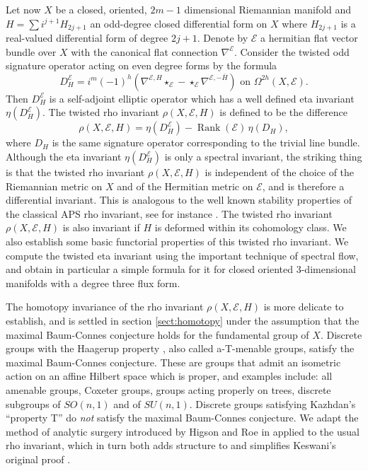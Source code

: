 \documentclass[12pt]{amsart}
\theoremstyle{plain}
\theoremstyle{definition}
\theoremstyle{remark}
\begin{document}
Let now $X$ be a closed, oriented, {{$2m - 1$}} dimensional Riemannian manifold and 
$H = \sum i^{j+1} H_{2j+1} $ an 
odd-degree closed differential form on $X$ where $H_{2j+1}$ is a real-valued differential form 
of degree ${2j+1}$. Denote by ${\mathcal E}$ a hermitian flat vector bundle over $X$ with the 
canonical flat connection $\nabla^{\mathcal E}$.
Consider the twisted odd signature operator acting on even degree forms by the formula
$$
{{D^{\mathcal E}_H = i^m (-1)^{ h} ( \nabla^{{\mathcal E}, H}\star_{\mathcal E} -  \star_{\mathcal E} \nabla^{{\mathcal E}, -{\overline{H}}})}} \text{ on }
\Omega^{2h}(X, {\mathcal E}).
$$
Then $D^{\mathcal E}_H$ is a self-adjoint
elliptic operator which has a well defined  eta invariant  $\eta(D^{\mathcal E}_H )$. The twisted rho invariant 
$\rho(X, {\mathcal E}, H)$ is defined to be the difference 
$$
\rho(X, {\mathcal E}, H) = \eta(D^{\mathcal E}_H ) - {\operatorname{Rank}} ({\mathcal E}) \, \eta(D_H ),
$$
where 
$D_H$ is the same signature operator corresponding to the trivial line bundle.
Although the eta invariant  $\eta(D^{\mathcal E}_H )$  is only a spectral invariant, the striking thing is that 
the twisted rho invariant $\rho(X,{\mathcal E},H)$ is independent of the
choice of the Riemannian metric on $X$ and of the Hermitian metric on ${\mathcal E}$, and is therefore a differential invariant. 
This is analogous to the well known stability properties of the classical  APS rho invariant, see for instance \cite{BP, BR}.
The twisted rho invariant $\rho(X,{\mathcal E},H)$ is also invariant if $H$ is deformed within its cohomology class.
We also establish some basic functorial properties of this twisted rho invariant.
We compute the twisted eta invariant using the important technique of spectral flow, 
and obtain in particular a simple formula for it for closed oriented 3-dimensional manifolds with a 
degree three flux form.

The homotopy invariance of the rho invariant $\rho(X,{\mathcal E},H)$ is more delicate to establish, 
and is settled in section \ref{sect:homotopy} under the assumption that the maximal Baum-Connes conjecture holds
for the fundamental group of $X$. 
Discrete groups with the Haagerup property \cite{Haagerup}, also called a-T-menable groups, satisfy  the maximal Baum-Connes conjecture. These are groups that admit an isometric action on an affine Hilbert space which is proper, and examples include: all amenable groups, Coxeter groups, groups acting properly on trees, 
discrete subgroups of $SO(n,1)$ and of $SU(n,1)$. Discrete 
groups satisfying Kazhdan's ``property T'' do {\em not} satisfy the maximal Baum-Connes conjecture.
We adapt the method of analytic surgery 
introduced by Higson and Roe in \cite{HigsonRoeRho} 
applied to the usual rho invariant, which in turn both adds structure to and simplifies Keswani's original proof \cite{Keswani}.
\end{document}
